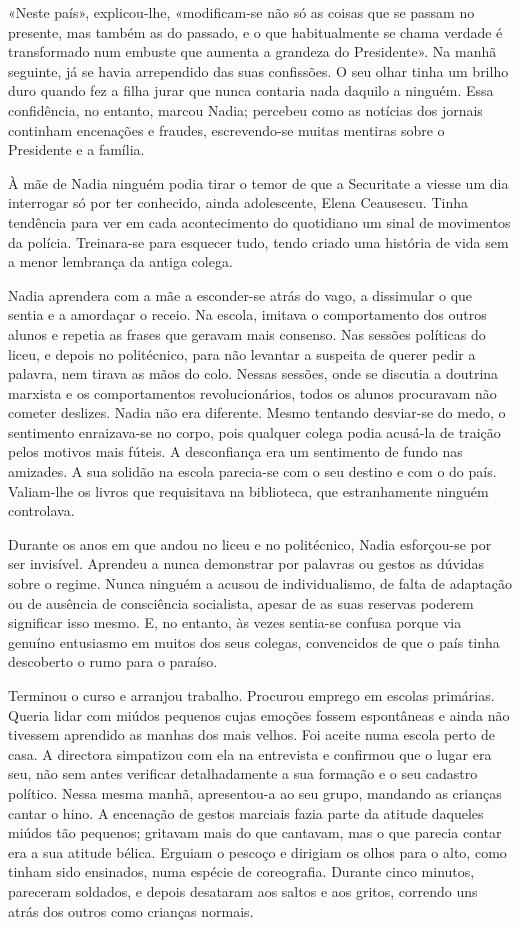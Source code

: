 «Neste país», explicou-lhe, «modificam-se não só as coisas que se passam
no presente, mas também as do passado, e o que habitualmente se chama
verdade é transformado num embuste que aumenta a grandeza do
Presidente». Na manhã seguinte, já se havia arrependido das suas
confissões. O seu olhar tinha um brilho duro quando fez a filha jurar
que nunca contaria nada daquilo a ninguém. Essa confidência, no entanto,
marcou Nadia; percebeu como as notícias dos jornais continham encenações
e fraudes, escrevendo-se muitas mentiras sobre o Presidente e a
família.

À mãe de Nadia ninguém podia tirar o temor de que a Securitate a viesse
um dia interrogar só por ter conhecido, ainda adolescente, Elena
Ceausescu. Tinha tendência para ver em cada acontecimento do quotidiano
um sinal de movimentos da polícia. Treinara-se para esquecer tudo, tendo
criado uma história de vida sem a menor lembrança da antiga colega.

Nadia aprendera com a mãe a esconder-se atrás do vago, a dissimular o
que sentia e a amordaçar o receio. Na
escola, imitava o comportamento dos outros alunos e repetia as frases
que geravam mais consenso. Nas sessões políticas do liceu, e depois no
politécnico, para não levantar a suspeita de querer pedir a palavra,
nem tirava as mãos do colo. Nessas sessões, onde se discutia a doutrina
marxista e os comportamentos revolucionários, todos os alunos procuravam
não cometer deslizes. Nadia não era diferente. Mesmo tentando desviar-se
do medo, o sentimento enraizava-se no corpo, pois qualquer colega
podia acusá-la de traição pelos motivos mais fúteis. A desconfiança
era um sentimento de fundo nas amizades. A sua solidão na escola
parecia-se com o seu destino e com o do país. Valiam-lhe os livros que
requisitava na biblioteca, que estranhamente ninguém controlava.

Durante os anos em que andou no liceu e no politécnico, Nadia esforçou-se por ser invisível. Aprendeu a nunca demonstrar
por palavras ou gestos as dúvidas sobre o regime. Nunca ninguém a acusou
de individualismo, de falta de adaptação ou de ausência de consciência
socialista, apesar de as suas reservas poderem significar isso mesmo. E,
no entanto, às vezes sentia-se confusa porque via genuíno entusiasmo em
muitos dos seus colegas, convencidos de que o país tinha descoberto o
rumo para o paraíso.

Terminou o curso e arranjou trabalho. Procurou emprego em escolas
primárias. Queria lidar com miúdos pequenos cujas emoções fossem
espontâneas e ainda não tivessem aprendido as manhas dos mais velhos.
Foi aceite numa escola perto de casa. A directora simpatizou com ela na
entrevista e confirmou que o lugar era seu, não sem antes verificar
detalhadamente a sua formação e o seu
cadastro político. Nessa mesma manhã, apresentou-a ao seu grupo,
mandando as crianças cantar o hino. A encenação de gestos marciais
fazia parte da atitude daqueles miúdos tão pequenos; gritavam mais do
que cantavam, mas o que parecia contar era a sua atitude bélica. Erguiam
o pescoço e dirigiam os olhos para o alto, como tinham sido ensinados,
numa espécie de coreografia. Durante cinco minutos, pareceram soldados,
e depois desataram aos saltos e aos gritos, correndo uns atrás dos
outros como crianças normais.

